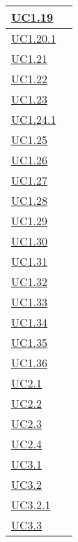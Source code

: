 \begin{longtable}{|P{6cm}|P{6cm}|}
	\hline \hyperref[UC1.19]{UC1.19} &  \\
	\hline \hyperref[UC1.20.1]{UC1.20.1} &  \\
	\hline \hyperref[UC1.21]{UC1.21} &  \\
	\hline \hyperref[UC1.22]{UC1.22} &  \\
	\hline \hyperref[UC1.23]{UC1.23} &  \\
	\hline \hyperref[UC1.24.1]{UC1.24.1} &  \\
	\hline \hyperref[UC1.25]{UC1.25} &  \\
	\hline \hyperref[UC1.26]{UC1.26} &  \\
	\hline \hyperref[UC1.27]{UC1.27} &  \\
	\hline \hyperref[UC1.28]{UC1.28} &  \\
	\hline \hyperref[UC1.29]{UC1.29} &  \\
	\hline \hyperref[UC1.30]{UC1.30} &  \\
	\hline \hyperref[UC1.31]{UC1.31} &  \\
	\hline \hyperref[UC1.32]{UC1.32} &  \\
	\hline \hyperref[UC1.33]{UC1.33} &  \\
	\hline \hyperref[UC1.34]{UC1.34} &  \\
	\hline \hyperref[UC1.35]{UC1.35} &  \\
	\hline \hyperref[UC1.36]{UC1.36} &  \\	
	\hline \hyperref[UC2.1]{UC2.1} &  \\
	\hline \hyperref[UC2.2]{UC2.2} &  \\
	\hline \hyperref[UC2.3]{UC2.3} &  \\
	\hline \hyperref[UC2.4]{UC2.4} &  \\	
	\hline \hyperref[UC3.1]{UC3.1} &  \\
	\hline \hyperref[UC3.2]{UC3.2} &  \\
	\hline \hyperref[UC3.2.1]{UC3.2.1} &  \\
	\hline \hyperref[UC3.3]{UC3.3} &  \\

\end{longtable}
